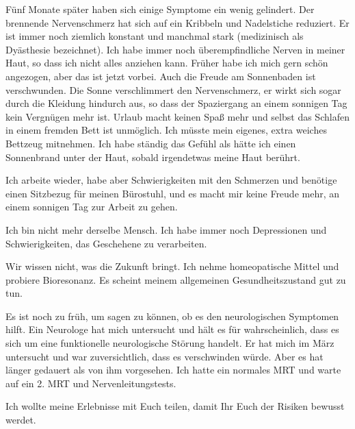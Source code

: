 Fünf Monate später haben sich einige Symptome ein wenig gelindert. Der brennende
Nervenschmerz hat sich auf ein Kribbeln und Nadelstiche reduziert. Er ist immer
noch ziemlich konstant und manchmal stark (medizinisch als Dyästhesie
bezeichnet). Ich habe immer noch überempfindliche Nerven in meiner Haut, so dass
ich nicht alles anziehen kann. Früher habe ich mich gern schön angezogen, aber
das ist jetzt vorbei. Auch die Freude am Sonnenbaden ist verschwunden. Die Sonne
verschlimmert den Nervenschmerz, er wirkt sich sogar durch die Kleidung hindurch
aus, so dass der Spaziergang an einem sonnigen Tag kein Vergnügen mehr
ist. Urlaub macht keinen Spaß mehr und selbst das Schlafen in einem fremden Bett
ist unmöglich. Ich müsste mein eigenes, extra weiches Bettzeug mitnehmen. Ich
habe ständig das Gefühl als hätte ich einen Sonnenbrand unter der Haut, sobald
irgendetwas meine Haut berührt.

Ich arbeite wieder, habe aber Schwierigkeiten mit den Schmerzen und benötige
einen Sitzbezug für meinen Bürostuhl, und es macht mir keine Freude mehr, an
einem sonnigen Tag zur Arbeit zu gehen.

Ich bin nicht mehr derselbe Mensch. Ich habe immer noch Depressionen und
Schwierigkeiten, das Geschehene zu verarbeiten.

Wir wissen nicht, was die Zukunft bringt. Ich nehme homeopatische Mittel und
probiere Bioresonanz. Es scheint meinem allgemeinen Gesundheitszustand gut zu
tun.

Es ist noch zu früh, um sagen zu können, ob es den neurologischen Symptomen
hilft. Ein Neurologe hat mich untersucht und hält es für wahrscheinlich, dass es
sich um eine funktionelle neurologische Störung handelt. Er hat mich im März
untersucht und war zuversichtlich, dass es verschwinden würde. Aber es hat
länger gedauert als von ihm vorgesehen. Ich hatte ein normales MRT und warte auf
ein 2. MRT und Nervenleitungstests.

Ich wollte meine Erlebnisse mit Euch teilen, damit Ihr Euch der Risiken bewusst
werdet.
